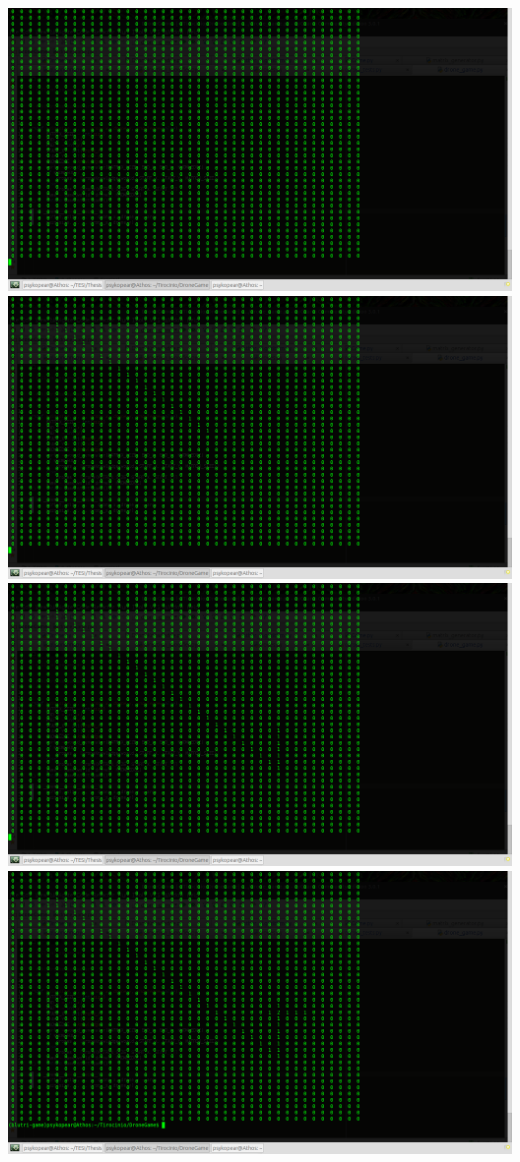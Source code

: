 \includegraphics[width=\textwidth]{immagini/Run5.png}
\includegraphics[width=\textwidth]{immagini/Run6.png}
\includegraphics[width=\textwidth]{immagini/Run7.png}
\includegraphics[width=\textwidth]{immagini/Run8.png}